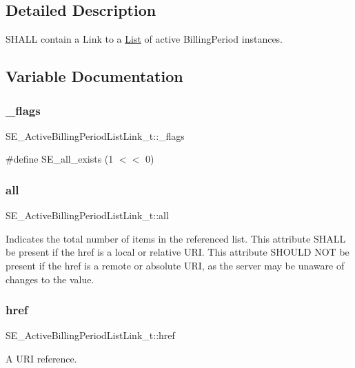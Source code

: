 \subsection{Detailed Description}
S\+H\+A\+LL contain a Link to a \hyperlink{structList}{List} of active Billing\+Period instances. 

\subsection{Variable Documentation}
\mbox{\label{group__ActiveBillingPeriodListLink_ga64ef5582fc32d3a39dfe9dd7240bbd71}} 
\subsubsection{\texorpdfstring{\+\_\+flags}{\_flags}}
{\footnotesize\ttfamily S\+E\+\_\+\+Active\+Billing\+Period\+List\+Link\+\_\+t\+::\+\_\+flags}

\#define S\+E\+\_\+all\+\_\+exists (1 $<$$<$ 0) \mbox{\label{group__ActiveBillingPeriodListLink_ga8bc21221a3c43c55939ec4201a003500}} 
\subsubsection{\texorpdfstring{all}{all}}
{\footnotesize\ttfamily S\+E\+\_\+\+Active\+Billing\+Period\+List\+Link\+\_\+t\+::all}

Indicates the total number of items in the referenced list. This attribute S\+H\+A\+LL be present if the href is a local or relative U\+RI. This attribute S\+H\+O\+U\+LD N\+OT be present if the href is a remote or absolute U\+RI, as the server may be unaware of changes to the value. \mbox{\label{group__ActiveBillingPeriodListLink_gadfabe0fe21a2310a4503768001c896ca}} 
\subsubsection{\texorpdfstring{href}{href}}
{\footnotesize\ttfamily S\+E\+\_\+\+Active\+Billing\+Period\+List\+Link\+\_\+t\+::href}

A U\+RI reference. 